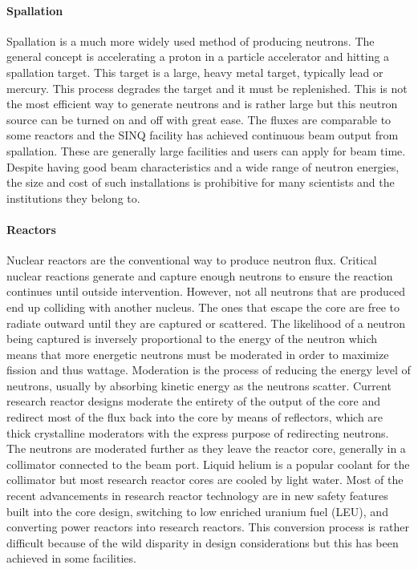 \paragraph{Spallation}

Spallation is a much more widely used method of producing neutrons. The general concept is accelerating a proton in a particle accelerator and hitting a spallation target. This target is a large, heavy metal target, typically lead or mercury. This process degrades the target and it must be replenished. This is not the most efficient way to generate neutrons and is rather large but this neutron source can be turned on and off with great ease. The fluxes are comparable to some reactors and the SINQ facility has achieved continuous beam output from spallation. These are generally large facilities and users can apply for beam time. Despite having good beam characteristics and a wide range of neutron energies, the size and cost of such installations is prohibitive for many scientists and the institutions they belong to.

\paragraph{Reactors}

Nuclear reactors are the conventional way to produce neutron flux. Critical nuclear reactions generate and capture enough neutrons to ensure the reaction continues until outside intervention. However, not all neutrons that are produced end up colliding with another nucleus. The ones that escape the core are free to radiate outward until they are captured or scattered. The likelihood of a neutron being captured is inversely proportional to the energy of the neutron which means that more energetic neutrons must be moderated in order to maximize fission and thus wattage. Moderation is the process of reducing the energy level of neutrons, usually by absorbing kinetic energy as the neutrons scatter. Current research reactor designs moderate the entirety of the output of the core and redirect most of the flux back into the core by means of reflectors, which are thick crystalline moderators with the express purpose of redirecting neutrons. The neutrons are moderated further as they leave the reactor core, generally in a collimator connected to the beam port. Liquid helium is a popular coolant for the collimator but most research reactor cores are cooled by light water. Most of the recent advancements in research reactor technology are in new safety features built into the core design, switching to low enriched uranium fuel (LEU), and converting power reactors into research reactors. This conversion process is rather difficult because of the wild disparity in design considerations but this has been achieved in some facilities.

